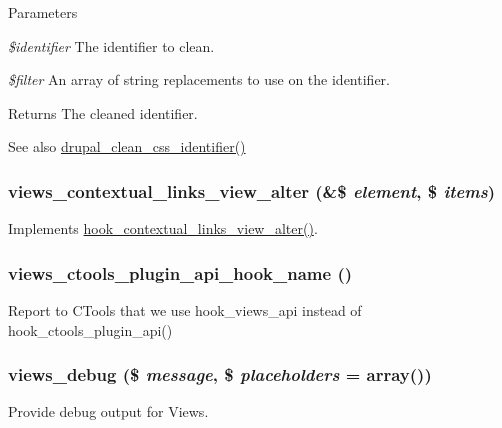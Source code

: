 \begin{DoxyParams}{Parameters}
\item[{\em \$identifier}]The identifier to clean. \item[{\em \$filter}]An array of string replacements to use on the identifier. \end{DoxyParams}
\begin{DoxyReturn}{Returns}
The cleaned identifier.
\end{DoxyReturn}
\begin{DoxySeeAlso}{See also}
\hyperlink{common_8inc_a71bc20ece521646a633b65868a441d26}{drupal\_\-clean\_\-css\_\-identifier()} 
\end{DoxySeeAlso}
\hypertarget{views_8module_ae9e5be1396c0f03114ade9e629d659ee}{
\subsubsection[{views\_\-contextual\_\-links\_\-view\_\-alter}]{\setlength{\rightskip}{0pt plus 5cm}views\_\-contextual\_\-links\_\-view\_\-alter (\&\$ {\em element}, \/  \$ {\em items})}}
\label{views_8module_ae9e5be1396c0f03114ade9e629d659ee}
Implements \hyperlink{group__hooks_ga30ebdd98be1d239b608b769bda0ca9f0}{hook\_\-contextual\_\-links\_\-view\_\-alter()}. \hypertarget{views_8module_abd5c327faf0b930512aaa7442a778504}{
\subsubsection[{views\_\-ctools\_\-plugin\_\-api\_\-hook\_\-name}]{\setlength{\rightskip}{0pt plus 5cm}views\_\-ctools\_\-plugin\_\-api\_\-hook\_\-name ()}}
\label{views_8module_abd5c327faf0b930512aaa7442a778504}
Report to CTools that we use hook\_\-views\_\-api instead of hook\_\-ctools\_\-plugin\_\-api() \hypertarget{views_8module_adb6971e0ec522398d8262cc90438e0f9}{
\subsubsection[{views\_\-debug}]{\setlength{\rightskip}{0pt plus 5cm}views\_\-debug (\$ {\em message}, \/  \$ {\em placeholders} = {\ttfamily array()})}}
\label{views_8module_adb6971e0ec522398d8262cc90438e0f9}
Provide debug output for Views.


